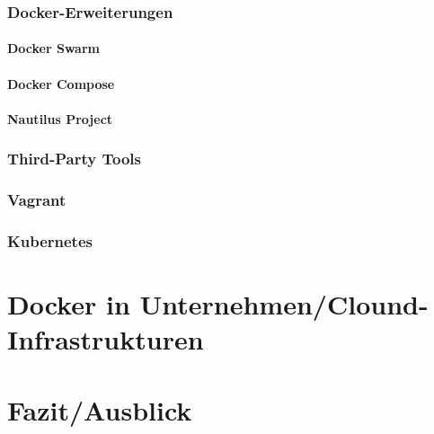 \documentclass[11pt,a4paper,oneside]{report}
\begin{document}
    \subsection{Docker-Erweiterungen}
      \subsubsection{Docker Swarm}
      \subsubsection{Docker Compose}
      \subsubsection{Nautilus Project}
    \subsection{Third-Party Tools}
  		\subsection{Vagrant}
  		\subsection{Kubernetes}
\chapter{Docker in Unternehmen/Clound-Infrastrukturen}


\chapter{Fazit/Ausblick}
\end{document}
